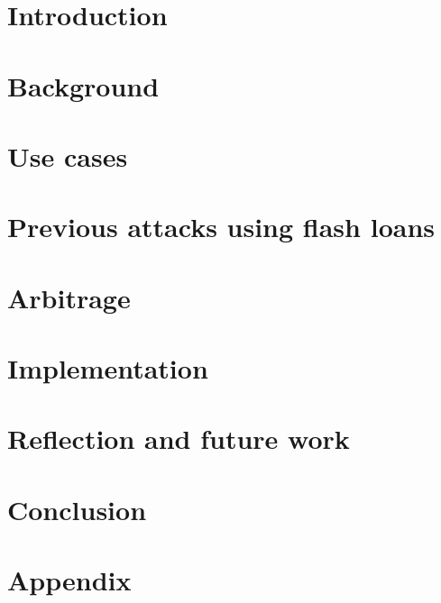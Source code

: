 


\begin{abstract}
    
\end{abstract}

\section{Introduction}\label{intro}


\section{Background}\label{back}


\section{Use cases}\label{use}


\section{Previous attacks using flash loans}\label{ex}


\section{Arbitrage}\label{arb}


\section{Implementation}\label{imp}


\section{Reflection and future work}\label{eval}


\section{Conclusion}\label{con}


\section{Appendix}\label{con}


\newpage
\printbibliography


